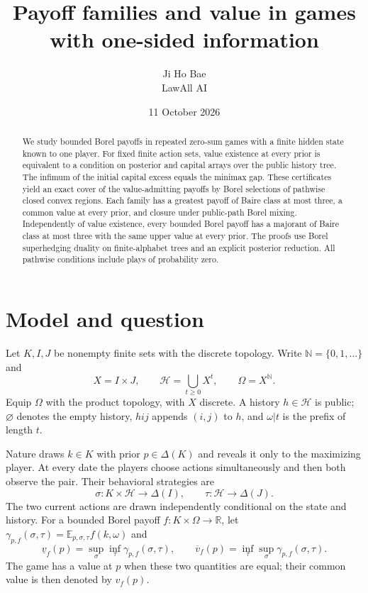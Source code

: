 \documentclass[11pt,a4paper]{article}
\title{Payoff families and value in games\\with one-sided information}
\author{Ji Ho Bae\\\small LawAll AI}
\date{11 October 2026}
\theoremstyle{definition}
\theoremstyle{remark}
\newcommand{\R}{\mathbb R}
\newcommand{\N}{\mathbb N}
\newcommand{\E}{\mathbb E}
\newcommand{\HH}{\mathcal H}
\newcommand{\lv}{\underline v}
\newcommand{\uv}{\overline v}
\begin{document}
\maketitle
\begin{abstract}
We study bounded Borel payoffs in repeated zero-sum games with a finite
hidden state known to one player. For fixed finite action sets, value
existence at every prior is equivalent to a condition on posterior and
capital arrays over the public history tree. The infimum of the initial capital
excess equals the minimax gap. These certificates yield an exact cover
of the value-admitting payoffs by Borel selections of pathwise closed
convex regions. Each family has a greatest payoff of Baire class at most
three, a common value at every prior, and closure under public-path
Borel mixing. Independently of value existence, every bounded Borel
payoff has a majorant of Baire class at most three with the same upper
value at every prior. The proofs use Borel superhedging duality on finite-alphabet trees
and an explicit posterior reduction. All pathwise conditions include
plays of probability zero.
\end{abstract}

\section{Model and question}\label{sec:model}

Let $K,I,J$ be nonempty finite sets with the discrete topology.
Write $\N=\{0,1,\ldots\}$ and
\[
 X=I\times J,\qquad \HH=\bigcup_{t\geq0}X^t,
 \qquad \Omega=X^{\N}.
\]
Equip $\Omega$ with the product topology, with $X$ discrete.
A history $h\in\HH$ is public; $\varnothing$ denotes the empty
history, $hij$ appends $(i,j)$ to $h$, and $\omega|t$ is the prefix of
length $t$.

Nature draws $k\in K$ with prior $p\in\Delta(K)$ and reveals it only to
the maximizing player. At every date the players choose actions
simultaneously and then both observe the pair. Their behavioral
strategies are
\[
 \sigma:K\times\HH\longrightarrow\Delta(I),\qquad
 \tau:\HH\longrightarrow\Delta(J).
\]
The two current actions are drawn independently conditional on the
state and history. For a bounded Borel payoff $f:K\times\Omega\to\R$,
let $\gamma_{p,f}(\sigma,\tau)=\E_{p,\sigma,\tau}f(k,\omega)$ and
\[
 \lv_f(p)=\sup_\sigma\inf_\tau\gamma_{p,f}(\sigma,\tau),\qquad
 \uv_f(p)=\inf_\tau\sup_\sigma\gamma_{p,f}(\sigma,\tau).
\]
The game has a value at $p$ when these two quantities are equal;
their common value is then denoted by $v_f(p)$.
\end{document}
